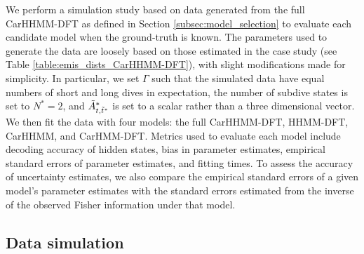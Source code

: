 
We perform a simulation study based on data generated from the full CarHHMM-DFT as defined in Section \ref{subsec:model_selection} to evaluate each candidate model when the ground-truth is known. The parameters used to generate the data are loosely based on those estimated in the case study (see Table \ref{table:emis_dists_CarHHMM-DFT}), with slight modifications made for simplicity. In particular, we set $\Gamma$ such that the simulated data have equal numbers of short and long dives in expectation, the number of subdive states is set to $N^*=2$, and $\tilde{A}^*_{t,\tilde t^*}$ is set to a scalar rather than a three dimensional vector. We then fit the data with four models: the full CarHHMM-DFT, HHMM-DFT, CarHHMM, and CarHMM-DFT. Metrics used to evaluate each model include decoding accuracy of hidden states, bias in parameter estimates, empirical standard errors of parameter estimates, and fitting times. To assess the accuracy of uncertainty estimates, we also compare the empirical standard errors of a given model's parameter estimates with the standard errors estimated from the inverse of the observed Fisher information under that model.

\subsection{Data simulation}
\label{subsec:data_simulation}

